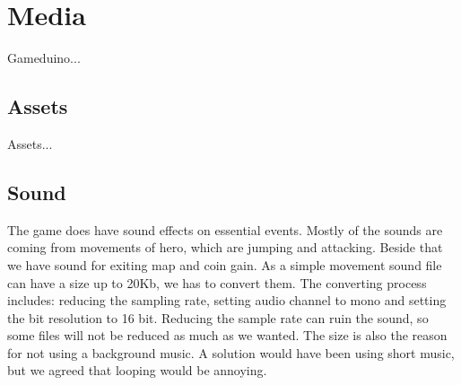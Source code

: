 \section{Media}
Gameduino...

\subsection{Assets}
Assets...

\subsection{Sound} %
The game does have sound effects on essential events. Mostly of the sounds
are coming from movements of hero, which are jumping and attacking.
Beside that we have sound for exiting map and coin gain. As a simple
movement sound file can have a size up to 20Kb, we has to convert them. The converting
process includes: reducing the sampling rate, setting audio channel to mono and setting
the bit resolution to 16 bit. Reducing the sample rate can ruin the sound, so some files
will not be reduced as much as we wanted. The size is also the reason for not using a
background music. A solution would have been using short music, but we agreed that
looping would be annoying.

